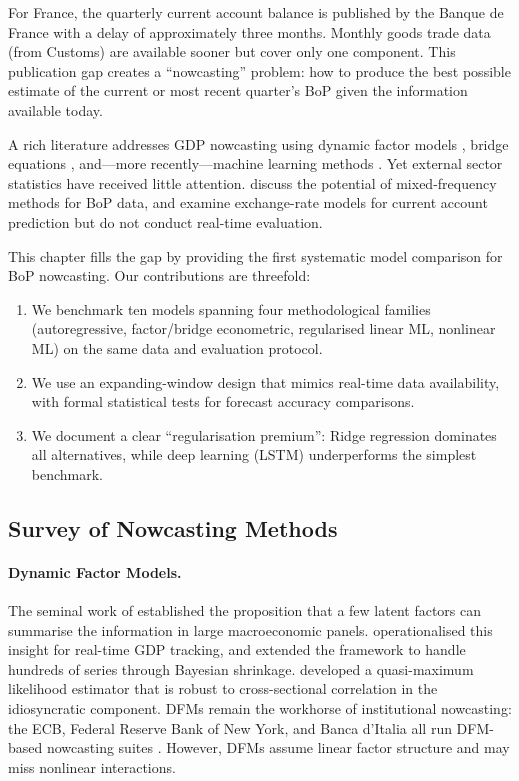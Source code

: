 For France, the quarterly current account balance is published by the Banque de France with a delay of approximately three months.  Monthly goods trade data (from Customs) are available sooner but cover only one component.  This publication gap creates a ``nowcasting'' problem: how to produce the best possible estimate of the current or most recent quarter's BoP given the information available today.

A rich literature addresses GDP nowcasting using dynamic factor models \citep{giannone2008nowcasting, stock2002macroeconomic}, bridge equations \citep{baffigi2004bridge, foroni2015unrestricted}, and---more recently---machine learning methods \citep{gouletcoulombe2022how, babii2022machine}.  Yet external sector statistics have received little attention.  \citet{ghysels2015macroeconomics} discuss the potential of mixed-frequency methods for BoP data, and \citet{cazorzi2017exchange} examine exchange-rate models for current account prediction but do not conduct real-time evaluation.

This chapter fills the gap by providing the first systematic model comparison for BoP nowcasting.  Our contributions are threefold:
\begin{enumerate}
  \item We benchmark ten models spanning four methodological families (autoregressive, factor/bridge econometric, regularised linear ML, nonlinear ML) on the same data and evaluation protocol.
  \item We use an expanding-window design that mimics real-time data availability, with formal statistical tests \citep{diebold1995comparing} for forecast accuracy comparisons.
  \item We document a clear ``regularisation premium'': Ridge regression dominates all alternatives, while deep learning (LSTM) underperforms the simplest benchmark.
\end{enumerate}

\subsection{Survey of Nowcasting Methods}
\label{sec:ch1_litreview}

\paragraph{Dynamic Factor Models.}
The seminal work of \citet{stock2002macroeconomic} established the proposition that a few latent factors can summarise the information in large macroeconomic panels.  \citet{giannone2008nowcasting} operationalised this insight for real-time GDP tracking, and \citet{banbura2010large} extended the framework to handle hundreds of series through Bayesian shrinkage.  \citet{doz2012quasi} developed a quasi-maximum likelihood estimator that is robust to cross-sectional correlation in the idiosyncratic component.  DFMs remain the workhorse of institutional nowcasting: the ECB, Federal Reserve Bank of New York, and Banca d'Italia all run DFM-based nowcasting suites \citep{bok2018macroeconomic}.  However, DFMs assume linear factor structure and may miss nonlinear interactions.

